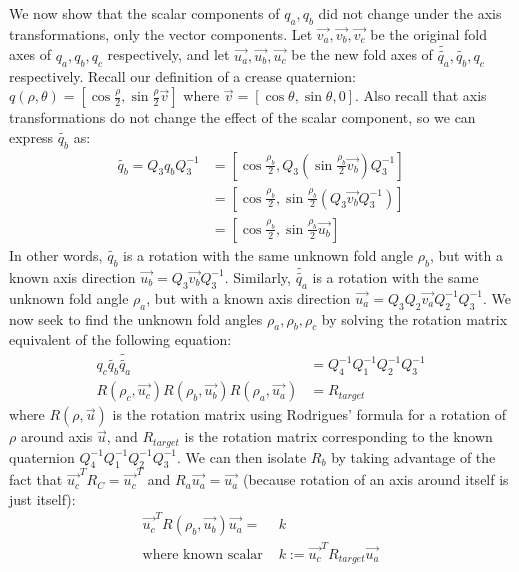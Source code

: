 \documentclass[11pt]{article}
\begin{document}
We now show that the scalar components of $q_a, q_b$ did not change under the axis transformations, only the vector components. Let $\vec{v_a}, \vec{v_b}, \vec{v_c}$ be the original fold axes of $q_a, q_b, q_c$ respectively, and let $\vec{u_a}, \vec{u_b}, \vec{u_c}$ be the new fold axes of $\tilde{\tilde{q_a}}, \tilde{q_b}, q_c$ respectively. Recall our definition of a crease quaternion: $q(\rho,\theta) = [\cos\frac{\rho}{2}, \sin\frac{\rho}{2}\vec{v}]$ where $\vec{v} = [\cos\theta, \sin\theta, 0]$. Also recall that axis transformations do not change the effect of the scalar component, so we can express $\tilde{q_b}$ as:
\begin{align}
    \tilde{q_b} = Q_3 q_b Q_3^{-1} &= [\cos\frac{\rho_b}{2}, Q_3(\sin\frac{\rho_b}{2} \vec{v_b})Q_3^{-1}]\\
    &= [\cos\frac{\rho_b}{2}, \sin\frac{\rho_b}{2} (Q_3 \vec{v_b} Q_3^{-1})]\\
    &= [\cos\frac{\rho_b}{2}, \sin\frac{\rho_b}{2} \vec{u_b}]
\end{align}
In other words, $\tilde{q_b}$ is a rotation with the same unknown fold angle $\rho_b$, but with a known axis direction $\vec{u_b} = Q_3 \vec{v_b} Q_3^{-1}$. Similarly, $\tilde{\tilde{q_a}}$ is a rotation with the same unknown fold angle $\rho_a$, but with a known axis direction $\vec{u_a} = Q_3 Q_2 \vec{v_a} Q_2^{-1} Q_3^{-1}$. We now seek to find the unknown fold angles $\rho_a, \rho_b, \rho_c$ by solving the rotation matrix equivalent of the following equation:
\begin{align}
    q_c \tilde{q_b} \tilde{\tilde{q_a}} &= Q_4^{-1} Q_1^{-1} Q_2^{-1} Q_3^{-1} \\
    R(\rho_c,\vec{u_c}) R(\rho_b,\vec{u_b}) R(\rho_a,\vec{u_a}) &= R_{target}
\end{align}
where $R(\rho,\vec{u})$ is the rotation matrix using Rodrigues' formula for a rotation of $\rho$ around axis $\vec{u}$, and $R_{target}$ is the rotation matrix corresponding to the known quaternion $Q_4^{-1} Q_1^{-1} Q_2^{-1} Q_3^{-1}$. We can then isolate $R_b$ by taking advantage of the fact that $\vec{u_c}^T R_C = \vec{u_c}^T$ and $R_a \vec{u_a} = \vec{u_a}$ (because rotation of an axis around itself is just itself):
\begin{align}
    \vec{u_c}^T R(\rho_b,\vec{u_b}) \vec{u_a} = &k\\
    \text{where known scalar } &k := \vec{u_c}^T R_{target} \vec{u_a}
\end{align}
\end{document}

